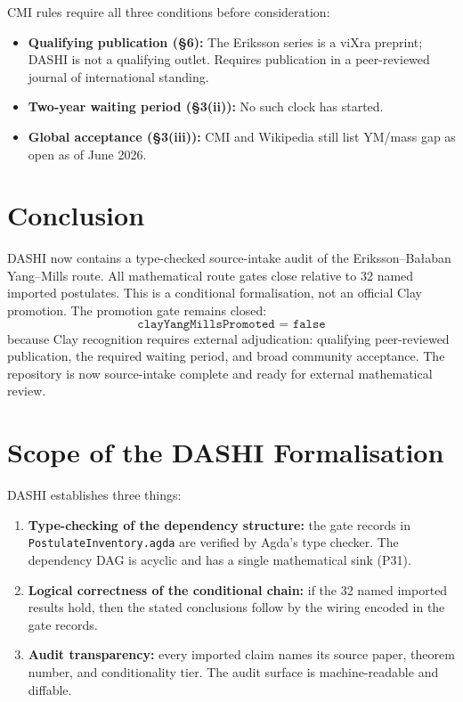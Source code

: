 \documentclass[11pt,a4paper]{article}
\begin{document}
CMI rules require all three conditions before consideration:
\begin{itemize}
\item \textbf{Qualifying publication (\S6):} The Eriksson series is a viXra
  preprint; DASHI is not a qualifying outlet.  Requires publication in a
  peer-reviewed journal of international standing.
\item \textbf{Two-year waiting period (\S3(ii)):} No such clock has started.
\item \textbf{Global acceptance (\S3(iii)):} CMI and Wikipedia still list
  YM/mass gap as open as of June 2026.
\end{itemize}

\section{Conclusion}

DASHI now contains a type-checked source-intake audit of the
Eriksson--Ba{\l}aban Yang--Mills route.  All mathematical route gates close
relative to 32 named imported postulates.  This is a conditional
formalisation, not an official Clay promotion.  The promotion gate remains
closed:
\[
\texttt{clayYangMillsPromoted = false}
\]
because Clay recognition requires external adjudication: qualifying
peer-reviewed publication, the required waiting period, and broad community
acceptance.  The repository is now source-intake complete and ready for
external mathematical review.

\appendix

\section{Scope of the DASHI Formalisation}

DASHI establishes three things:

\begin{enumerate}
\item \textbf{Type-checking of the dependency structure:} the gate records in
  \texttt{PostulateInventory.agda} are verified by Agda's type checker.
  The dependency DAG is acyclic and has a single mathematical sink (P31).

\item \textbf{Logical correctness of the conditional chain:} if the 32 named
  imported results hold, then the stated conclusions follow by the wiring
  encoded in the gate records.

\item \textbf{Audit transparency:} every imported claim names its source paper,
  theorem number, and conditionality tier.  The audit surface is
  machine-readable and diffable.
\end{enumerate}
\end{document}
